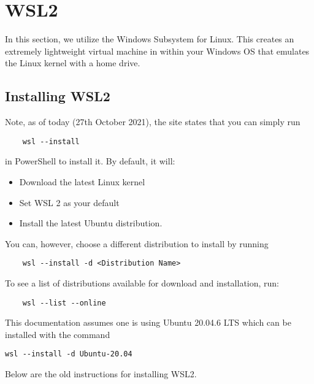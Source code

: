 \chapter{WSL2} \label{ChapWSL2}

In this section, we utilize the Windows Subsystem for Linux. This creates an
extremely lightweight virtual machine in within your Windows OS that emulates
the Linux kernel with a home drive.

\section{Installing WSL2}
Note, as of today (27th October 2021), the site \cite{microsoft2021wsl} states
that you can simply run
\begin{lstlisting}
    wsl --install
\end{lstlisting}
in PowerShell to install it. By default, it will:
\begin{itemize}
    \item Download the latest Linux kernel
    \item Set WSL 2 as your default
    \item Install the latest Ubuntu distribution.
\end{itemize}
You can, however, choose a different distribution to install by running
\begin{lstlisting}
    wsl --install -d <Distribution Name>
\end{lstlisting}
To see a list of distributions available for download and installation, run:
\begin{lstlisting}
    wsl --list --online
\end{lstlisting}
This documentation assumes one is using Ubuntu 20.04.6 LTS which can be
installed with the command
\begin{lstlisting}
wsl --install -d Ubuntu-20.04
\end{lstlisting}
Below are the old instructions for installing WSL2.\\

